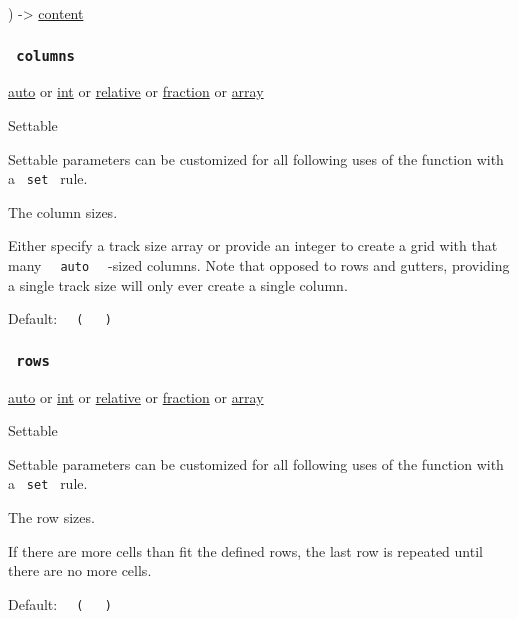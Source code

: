 ) -\textgreater{} \href{/docs/reference/foundations/content/}{content}

\subsubsection{\texorpdfstring{\texttt{\ columns\ }}{ columns }}\label{parameters-columns}

\href{/docs/reference/foundations/auto/}{auto} {or}
\href{/docs/reference/foundations/int/}{int} {or}
\href{/docs/reference/layout/relative/}{relative} {or}
\href{/docs/reference/layout/fraction/}{fraction} {or}
\href{/docs/reference/foundations/array/}{array}

{{ Settable }}

\label{parameters-columns-settable-tooltip}
Settable parameters can be customized for all following uses of the
function with a \texttt{\ set\ } rule.

The column sizes.

Either specify a track size array or provide an integer to create a grid
with that many \texttt{\ }{\texttt{\ auto\ }}\texttt{\ } -sized columns.
Note that opposed to rows and gutters, providing a single track size
will only ever create a single column.

Default:
\texttt{\ }{\texttt{\ (\ }}\texttt{\ }{\texttt{\ )\ }}\texttt{\ }

\subsubsection{\texorpdfstring{\texttt{\ rows\ }}{ rows }}\label{parameters-rows}

\href{/docs/reference/foundations/auto/}{auto} {or}
\href{/docs/reference/foundations/int/}{int} {or}
\href{/docs/reference/layout/relative/}{relative} {or}
\href{/docs/reference/layout/fraction/}{fraction} {or}
\href{/docs/reference/foundations/array/}{array}

{{ Settable }}

\label{parameters-rows-settable-tooltip}
Settable parameters can be customized for all following uses of the
function with a \texttt{\ set\ } rule.

The row sizes.

If there are more cells than fit the defined rows, the last row is
repeated until there are no more cells.

Default:
\texttt{\ }{\texttt{\ (\ }}\texttt{\ }{\texttt{\ )\ }}\texttt{\ }

